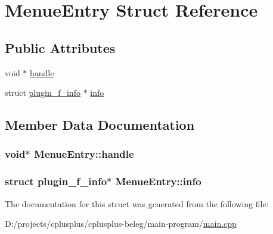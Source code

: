 \hypertarget{struct_menue_entry}{\section{Menue\-Entry Struct Reference}
\label{struct_menue_entry}
}
\subsection*{Public Attributes}
\begin{DoxyCompactItemize}
\item 
void $\ast$ \hyperlink{struct_menue_entry_a5b3df3b8e08d1b724c08abc31904cc6e}{handle}
\item 
struct \hyperlink{struct_h_t_w_1_1_a_i_1_1_beleg_1_1_plugin_1_1plugin__f__info}{plugin\-\_\-f\-\_\-info} $\ast$ \hyperlink{struct_menue_entry_a3dd5e60a87bdae9d800ca547d83d6a73}{info}
\end{DoxyCompactItemize}


\subsection{Member Data Documentation}
\hypertarget{struct_menue_entry_a5b3df3b8e08d1b724c08abc31904cc6e}{
\subsubsection[{handle}]{\setlength{\rightskip}{0pt plus 5cm}void$\ast$ Menue\-Entry\-::handle}}\label{struct_menue_entry_a5b3df3b8e08d1b724c08abc31904cc6e}
\hypertarget{struct_menue_entry_a3dd5e60a87bdae9d800ca547d83d6a73}{
\subsubsection[{info}]{\setlength{\rightskip}{0pt plus 5cm}struct {\bf plugin\-\_\-f\-\_\-info}$\ast$ Menue\-Entry\-::info}}\label{struct_menue_entry_a3dd5e60a87bdae9d800ca547d83d6a73}


The documentation for this struct was generated from the following file\-:\begin{DoxyCompactItemize}
\item 
D\-:/projects/cplusplus/cplusplus-\/beleg/main-\/program/\hyperlink{main_8cpp}{main.\-cpp}\end{DoxyCompactItemize}
